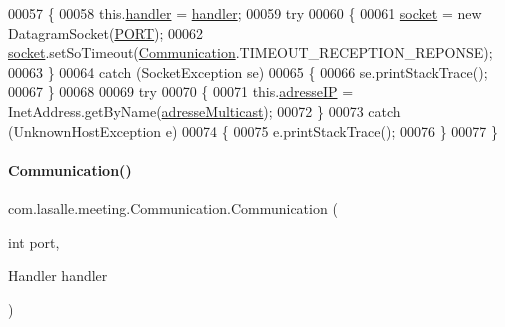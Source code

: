 \begin{DoxyCode}
00057     \{
00058         this.\hyperlink{classcom_1_1lasalle_1_1meeting_1_1_communication_a05fa5f360f28819a9e106e0265a74643}{handler} = \hyperlink{classcom_1_1lasalle_1_1meeting_1_1_communication_a05fa5f360f28819a9e106e0265a74643}{handler};
00059         \textcolor{keywordflow}{try}
00060         \{
00061             \hyperlink{classcom_1_1lasalle_1_1meeting_1_1_communication_a2a538f36640aecebbb833bbaf1f03858}{socket} = \textcolor{keyword}{new} DatagramSocket(\hyperlink{classcom_1_1lasalle_1_1meeting_1_1_communication_abf48fd6a29d87d67f4941494404f1ea7}{PORT});
00062             \hyperlink{classcom_1_1lasalle_1_1meeting_1_1_communication_a2a538f36640aecebbb833bbaf1f03858}{socket}.setSoTimeout(\hyperlink{classcom_1_1lasalle_1_1meeting_1_1_communication_a3d73554b2774d3274ad385b0faa27d14}{Communication}.TIMEOUT\_RECEPTION\_REPONSE);
00063         \}
00064         \textcolor{keywordflow}{catch} (SocketException se)
00065         \{
00066             se.printStackTrace();
00067         \}
00068 
00069         \textcolor{keywordflow}{try}
00070         \{
00071             this.\hyperlink{classcom_1_1lasalle_1_1meeting_1_1_communication_a46e5fbc8ec97ad651d544e09121a6468}{adresseIP} = InetAddress.getByName(\hyperlink{classcom_1_1lasalle_1_1meeting_1_1_communication_a6a2d2e62f87bef261a1999eb5acf8abb}{adresseMulticast});
00072         \}
00073         \textcolor{keywordflow}{catch} (UnknownHostException e)
00074         \{
00075             e.printStackTrace();
00076         \}
00077     \}
\end{DoxyCode}
\mbox{\label{classcom_1_1lasalle_1_1meeting_1_1_communication_a38c93366f750b357d248572d85577d8f}} 
\paragraph{\texorpdfstring{Communication()}{Communication()}\hspace{0.1cm}{\footnotesize\ttfamily [2/2]}}
{\footnotesize\ttfamily com.\+lasalle.\+meeting.\+Communication.\+Communication (\begin{DoxyParamCaption}\item[{int}]{port,  }\item[{Handler}]{handler }\end{DoxyParamCaption})}



